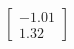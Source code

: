 \documentclass[preview]{standalone}
\begin{document}
\begin{align*}
\begin{bmatrix} -1.01 \\ 1.32 \end{bmatrix}
\end{align*}
\end{document}
